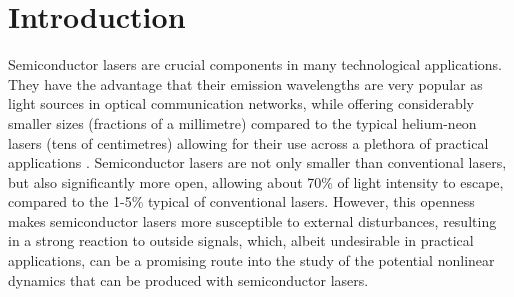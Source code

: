 \section{Introduction}
\label{sec:introduction}
%
Semiconductor lasers are crucial components in many technological applications. They have the advantage that their emission wavelengths are very popular as light sources in optical communication networks, while offering considerably smaller sizes (fractions of a millimetre) compared to the typical helium-neon lasers (tens of centimetres) allowing for their use across a plethora of practical applications \cite{vantartwijk1995semiconductor}. Semiconductor lasers are not only smaller than conventional lasers, but also significantly more open, allowing about 70\% of light intensity to escape, compared to the 1-5\% typical of conventional lasers. However, this openness makes semiconductor lasers more susceptible to external disturbances, resulting in a strong reaction to outside signals, which, albeit undesirable in practical applications, can be a promising route into the study of the potential nonlinear dynamics that can be produced with semiconductor lasers.
%
%
